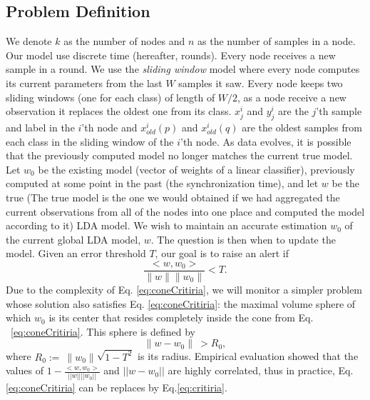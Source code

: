 \documentclass{sig-alternate-05-2015}
\begin{document}
\subsection{Problem Definition}
We denote $k$ as the number of nodes and
$n$ as the number of samples in a node.
Our model use discrete time (hereafter, rounds). Every node receives a new sample
in a round.
We use the \textit{sliding window} model where every node computes its current
parameters from the last $W$ samples it saw.
Every node keeps two sliding windows (one for each class) of length of $W/2$, as
a node receive a new observation it replaces the oldest one from its class.
$x^i_j$ and $y^i_j$ are the $j$'th sample and label in the $i$'th node
and $x_{old}^i(p)$ and $x_{old}^i(q)$ are the oldest samples from each class in
the sliding window of the $i$'th node. 
As data evolves, it is possible that the previously computed model
no longer matches the current true model.
Let $w_0$ be the existing model (vector of weights of a linear classifier),
previously computed at some point in the past (the synchronization time),
and let $w$ be the true
(The true model is the one we would obtained if we had aggregated the current observations
from all of the nodes into one place and computed the model according to it) LDA
model.
We wish to maintain an accurate estimation $w_0$ of the current global LDA model, $w$.
The question is then when to update the model.
Given an error threshold $T$, our goal is to raise an alert if
\begin{equation} \label{eq:coneCritiria}
\frac{<w,w_0>}{\parallel w \parallel \parallel w_0 \parallel}  < T.
\end{equation}
Due to the complexity of Eq. \ref{eq:coneCritiria},
we will monitor a simpler problem whose solution also satisfies
Eq. \ref{eq:coneCritiria}: the maximal volume sphere of which $w_0$ is its center
that resides completely inside the cone from Eq. ~\ref{eq:coneCritiria}.
This sphere is defined by
\begin{equation} \label{eq:critiria}
\parallel w-w_0 \parallel \  >  R_0,
\end{equation}
where $R_0 := \  \parallel w_0 \parallel \sqrt{1-T^2}$ is its radius.
Empirical evaluation showed that the values of 
$1-\frac{<w,w_0>}{||w||||w_0||}$ and $||w-w_0||$ are
highly  correlated, thus in practice, Eq. \ref{eq:coneCritiria} 
can be replaces by Eq.\ref{eq:critiria}.
\end{document}
